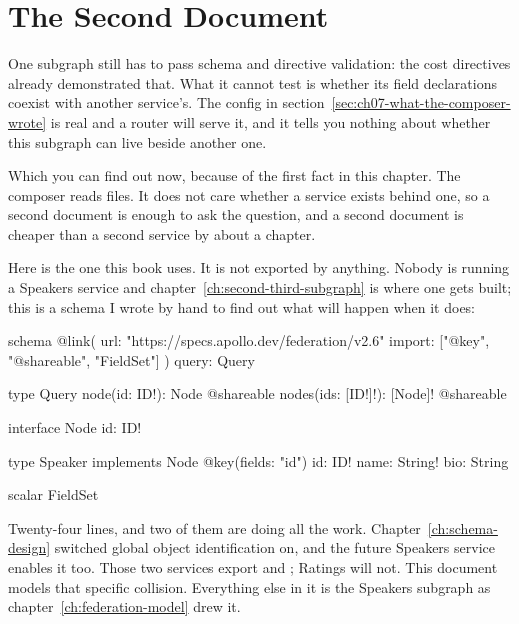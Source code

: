 \section{The Second Document}
\label{sec:ch07-the-second-document}

%
One subgraph still has to pass schema and directive validation: the cost
directives already demonstrated that. What it cannot test is whether its
field declarations coexist with another service's. The config in
section~\ref{sec:ch07-what-the-composer-wrote} is real and a router will serve
it, and it tells you nothing about whether this subgraph can live beside
another one.

%
Which you can find out now, because of the first fact in this chapter. The
composer reads files. It does not care whether a service exists behind one, so
a second document is enough to ask the question, and a second document is
cheaper than a second service by about a chapter.

%
Here is the one this book uses. It is not exported by anything. Nobody is
running a Speakers service and chapter~\ref{ch:second-third-subgraph} is where
one gets built; this is a schema I wrote by hand to find out what will happen
when it does:

\begin{graphqlsdl}
schema
  @link(
    url: "https://specs.apollo.dev/federation/v2.6"
    import: ["@key", "@shareable", "FieldSet"]
  ) {
  query: Query
}

type Query {
  node(id: ID!): Node @shareable
  nodes(ids: [ID!]!): [Node]! @shareable
}

interface Node {
  id: ID!
}

type Speaker implements Node @key(fields: "id") {
  id: ID!
  name: String!
  bio: String
}

scalar FieldSet
\end{graphqlsdl}

%
Twenty-four lines, and two of them are doing all the work.
Chapter~\ref{ch:schema-design} switched global object identification on, and
the future Speakers service enables it too. Those two services export
 and ; Ratings will not. This document models that
specific collision. Everything else in it is the Speakers
subgraph as chapter~\ref{ch:federation-model} drew it.

